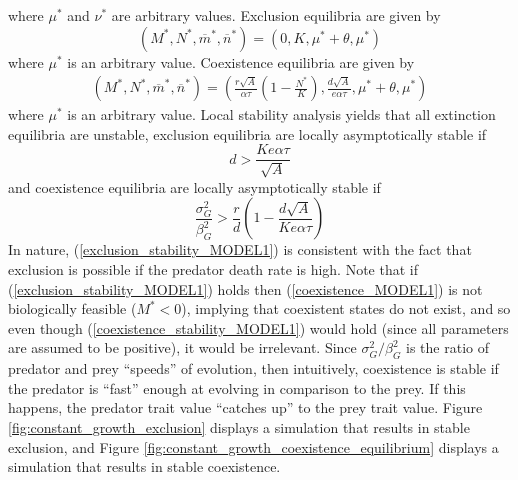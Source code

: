 \documentclass{amsart}
\theoremstyle{definition}
\theoremstyle{remark}
\numberwithin{equation}{section}
\begin{document}
where $\mu^*$ and $\nu^*$ are arbitrary values.  Exclusion equilibria are given by
\begin{equation}
	\label{exclusion_MODEL1}
	(M^*, N^*, \overline{m}^*, \overline{n}^*) = (0, K, \mu^* + \theta, \mu^*)
\end{equation}
where $\mu^*$ is an arbitrary value.  Coexistence equilibria are given by
\begin{equation}
	\label{coexistence_MODEL1}
	\begin{aligned}
		(M^*, N^*, \overline{m}^*, \overline{n}^*) = \left(\frac{r\sqrt{A}}{\alpha\tau}\left(1 - \frac{N^*}{K}\right), \frac{d\sqrt{A}}{e\alpha\tau}, \mu^* + \theta, \mu^*\right)
	\end{aligned}
\end{equation}
where $\mu^*$ is an arbitrary value.  Local stability analysis yields that all extinction equilibria are unstable, exclusion equilibria are locally asymptotically stable if
\begin{equation}
	\label{exclusion_stability_MODEL1}
	d > \frac{Ke\alpha\tau}{\sqrt{A}}
\end{equation}
and coexistence equilibria are locally asymptotically stable if
\begin{equation}
	\label{coexistence_stability_MODEL1}
	\frac{\sigma_G^2}{\beta_G^2} > \frac{r}{d}\left(1 - \frac{d\sqrt{A}}{Ke\alpha\tau}\right)
\end{equation}
In nature, (\ref{exclusion_stability_MODEL1}) is consistent with the fact that exclusion is possible if the predator death rate is high.  Note that if (\ref{exclusion_stability_MODEL1}) holds then (\ref{coexistence_MODEL1}) is not biologically feasible ($M^* < 0$), implying that coexistent states do not exist, and so even though (\ref{coexistence_stability_MODEL1}) would hold (since all parameters are assumed to be positive), it would be irrelevant.  Since $\sigma_G^2/\beta_G^2$ is the ratio of predator and prey ``speeds'' of evolution, then intuitively, coexistence is stable if the predator is ``fast'' enough at evolving in comparison to the prey.  If this happens, the predator trait value ``catches up'' to the prey trait value.  Figure \ref{fig:constant_growth_exclusion} displays a simulation that results in stable exclusion, and Figure \ref{fig:constant_growth_coexistence_equilibrium} displays a simulation that results in stable coexistence.
\end{document}
